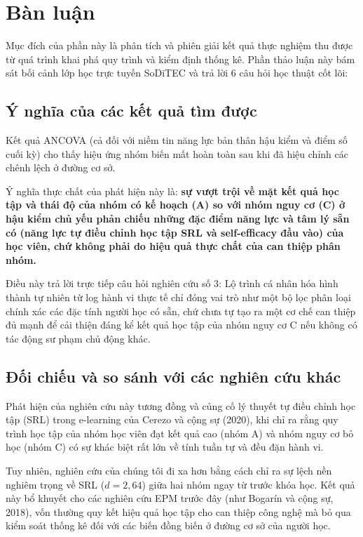 \section{Bàn luận}

Mục đích của phần này là phân tích và phiên giải kết quả thực nghiệm thu được từ quá trình khai phá quy trình và kiểm định thống kê. Phần thảo luận này bám sát bối cảnh lớp học trực tuyến SoDiTEC và trả lời 6 câu hỏi học thuật cốt lõi:

\subsection{Ý nghĩa của các kết quả tìm được}

Kết quả ANCOVA (cả đối với niềm tin năng lực bản thân hậu kiểm và điểm số cuối kỳ) cho thấy hiệu ứng nhóm biến mất hoàn toàn sau khi đã hiệu chỉnh các chênh lệch ở đường cơ sở. 

Ý nghĩa thực chất của phát hiện này là: \textbf{sự vượt trội về mặt kết quả học tập và thái độ của nhóm có kế hoạch (A) so với nhóm nguy cơ (C) ở hậu kiểm chủ yếu phản chiếu những đặc điểm năng lực và tâm lý sẵn có (năng lực tự điều chỉnh học tập SRL và self-efficacy đầu vào) của học viên, chứ không phải do hiệu quả thực chất của can thiệp phân nhóm.}

Điều này trả lời trực tiếp câu hỏi nghiên cứu số 3: Lộ trình cá nhân hóa hình thành tự nhiên từ log hành vi thực tế chỉ đóng vai trò như một bộ lọc phân loại chính xác các đặc tính người học có sẵn, chứ chưa tự tạo ra một cơ chế can thiệp đủ mạnh để cải thiện đáng kể kết quả học tập của nhóm nguy cơ C nếu không có tác động sư phạm chủ động khác.

\subsection{Đối chiếu và so sánh với các nghiên cứu khác}

Phát hiện của nghiên cứu này tương đồng và củng cố lý thuyết tự điều chỉnh học tập (SRL) trong e-learning của Cerezo và cộng sự (2020), khi chỉ ra rằng quy trình học tập của nhóm học viên đạt kết quả cao (nhóm A) và nhóm nguy cơ bỏ học (nhóm C) có sự khác biệt rất lớn về tính tuần tự và đều đặn hành vi. 

Tuy nhiên, nghiên cứu của chúng tôi đi xa hơn bằng cách chỉ ra sự lệch nền nghiêm trọng về SRL ($d = 2,64$) giữa hai nhóm ngay từ trước khóa học. Kết quả này bổ khuyết cho các nghiên cứu EPM trước đây (như Bogarín và cộng sự, 2018), vốn thường quy kết hiệu quả học tập cho can thiệp công nghệ mà bỏ qua kiểm soát thống kê đối với các biến đồng biến ở đường cơ sở của người học.

